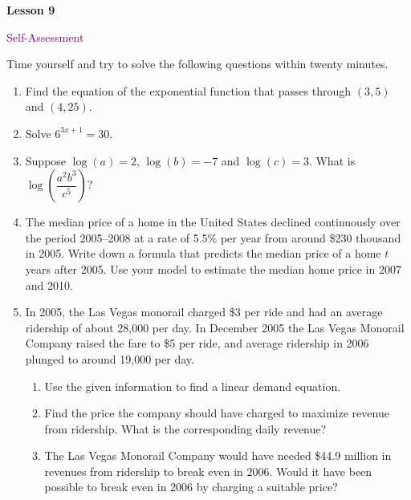 \documentclass[10pt]{book}
\theoremstyle{definition}
\theoremstyle{remark}
\begin{document}
\begin{tcolorbox}[
  width=\textwidth,
  colback=gray!10, %
  colframe=white, %
  boxrule=0pt,    %
  left=1cm,       %
  right=1cm,      %
  sharp corners  %
]

\begin{minipage}[t]{0.5\textwidth}
  \Huge \textbf{Lesson 9}
\end{minipage}%
\hfill
\begin{minipage}[t]{0.5\textwidth}
  \Huge\textcolor{purple}{Self-Assessment}
\end{minipage}
\end{tcolorbox}

\begin{large}
\noindent
Time yourself and try to solve the following questions within twenty minutes. 
\begin{enumerate}
\item Find the equation of the exponential function that passes through $(3,5)$ and $(4,25)$. \vfil
\item Solve $6^{3x+1} = 30$.\vfil
\item Suppose $\log(a) = 2$, $\log(b) = -7$ and $\log(c) = 3$.  What is $\log\left(\dfrac{a^2b^3}{c^5} \right)$?\vfil
\item The median price of a home in the United States declined continuously over the period 2005–2008 at a rate of 5.5\% per year from around \$230 thousand in 2005.  Write down a formula that predicts the median price of a home $t$ years after 2005. Use your model to estimate the median home price in 2007 and 2010.\vfil
\item In 2005, the Las Vegas monorail charged \$3 per ride and had an average ridership of about 28,000 per day. In December 2005 the Las Vegas Monorail Company raised the fare to \$5 per ride, and average ridership in 2006 plunged to around 19,000 per day.
\begin{enumerate}
	\item	Use the given information to find a linear demand equation.
	\item  Find the price the company should have charged to maximize revenue from ridership. What is the corresponding daily revenue?
	\item  The Las Vegas Monorail Company would have needed \$44.9 million in revenues from ridership to break even in 2006. Would it have been possible to break even in 2006 by charging a suitable price? 
\end{enumerate}\vfil
\end{enumerate}


\end{large}
\end{document}
